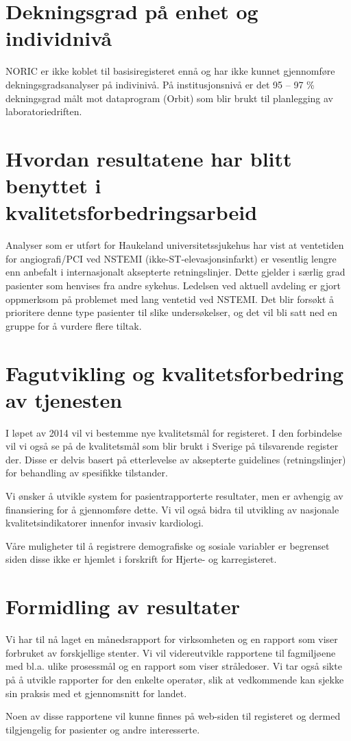 \documentclass[norsk, a4paper]{report}
\begin{document}
\chapter{Dekningsgrad på enhet og individnivå}
NORIC er ikke koblet til basisiregisteret ennå og har ikke kunnet gjennomføre dekningsgradsanalyser på indivinivå.  På institusjonsnivå er det 95 – 97 \% dekningsgrad målt mot dataprogram (Orbit) som blir brukt til planlegging av laboratoriedriften.

\chapter{Hvordan resultatene har blitt benyttet i kvalitetsforbedringsarbeid}
Analyser som er utført for Haukeland universitetssjukehus har vist at ventetiden for angiografi/PCI ved NSTEMI (ikke-ST-elevasjonsinfarkt) er vesentlig lengre enn anbefalt i internasjonalt aksepterte retningslinjer. Dette gjelder i særlig grad pasienter som henvises fra andre sykehus. Ledelsen ved aktuell avdeling er gjort oppmerksom på problemet med lang ventetid ved NSTEMI. Det blir forsøkt å prioritere denne type pasienter til slike undersøkelser, og det vil bli satt ned en gruppe for å vurdere flere tiltak.







\chapter{Fagutvikling og kvalitetsforbedring av tjenesten}

I løpet av 2014 vil vi bestemme nye kvalitetsmål for registeret. I den forbindelse vil vi også se på de kvalitetsmål som blir brukt i Sverige på tilsvarende register der.  Disse er delvis basert på etterlevelse av aksepterte guidelines (retningslinjer) for behandling av spesifikke tilstander.   

Vi ønsker å utvikle system for pasientrapporterte resultater, men er avhengig av finansiering for å gjennomføre dette. Vi vil også bidra til utvikling av nasjonale kvalitetsindikatorer innenfor invasiv kardiologi.

Våre muligheter til å registrere demografiske og sosiale variabler er begrenset siden disse ikke er hjemlet i forskrift for Hjerte- og karregisteret.


\chapter{Formidling av resultater}

Vi har til nå laget en månedsrapport for virksomheten og en rapport som viser forbruket av forskjellige stenter. Vi vil videreutvikle rapportene til fagmiljøene med bl.a. ulike prosessmål og en rapport som viser stråledoser. Vi tar også sikte på å utvikle rapporter for den enkelte operatør, slik at vedkommende kan sjekke sin praksis med et gjennomsnitt for landet.  

Noen av disse rapportene vil kunne finnes på web-siden til registeret og dermed tilgjengelig for pasienter og andre interesserte.
\end{document}
